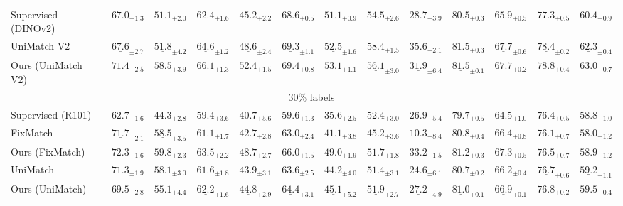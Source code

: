 \documentclass{article}\usepackage[a4paper,landscape,margin=1cm]{geometry}
\begin{document}
\begin{table}[!t]
\begin{tabularx}{\textwidth}{@{}l*{12}{>{\centering\arraybackslash}X}@{}}
\arrayrulecolor[gray]{0.65}\cmidrule[0.3pt]{1-13}\arrayrulecolor{black}
Supervised (DINOv2) & $67.0_{\pm1.3}$ & $51.1_{\pm2.0}$ & $62.4_{\pm1.6}$ & $45.2_{\pm2.2}$ & $68.6_{\pm0.5}$ & $51.1_{\pm0.9}$ & $54.5_{\pm2.6}$ & $28.7_{\pm3.9}$ & $80.5_{\pm0.3}$ & $65.9_{\pm0.5}$ & $77.3_{\pm0.5}$ & $60.4_{\pm0.9}$ \\
UniMatch V2 & $\underline{67.6}_{\pm2.7}$ & $\underline{51.8}_{\pm4.2}$ & $\underline{64.6}_{\pm1.2}$ & $\underline{48.6}_{\pm2.4}$ & $\underline{69.3}_{\pm1.1}$ & $\underline{52.5}_{\pm1.6}$ & $\mathbf{58.4}_{\pm1.5}$ & $\mathbf{35.6}_{\pm2.1}$ & $\mathbf{81.5}_{\pm0.3}$ & $\underline{67.7}_{\pm0.6}$ & $\underline{78.4}_{\pm0.2}$ & $\underline{62.3}_{\pm0.4}$ \\
Ours (UniMatch V2) & $\mathbf{71.4}_{\pm2.5}$ & $\mathbf{58.5}_{\pm3.9}$ & $\mathbf{66.1}_{\pm1.3}$ & $\mathbf{52.4}_{\pm1.5}$ & $\mathbf{69.4}_{\pm0.8}$ & $\mathbf{53.1}_{\pm1.1}$ & $\underline{56.1}_{\pm3.0}$ & $\underline{31.9}_{\pm6.4}$ & $\underline{81.5}_{\pm0.1}$ & $\mathbf{67.7}_{\pm0.2}$ & $\mathbf{78.8}_{\pm0.4}$ & $\mathbf{63.0}_{\pm0.7}$ \\
\midrule
\multicolumn{13}{c}{30\% labels} \\
\cmidrule{1-13}
Supervised (R101) & $62.7_{\pm1.6}$ & $44.3_{\pm2.8}$ & $59.4_{\pm3.6}$ & $40.7_{\pm5.6}$ & $59.6_{\pm1.3}$ & $35.6_{\pm2.5}$ & $\mathbf{52.4}_{\pm3.0}$ & $26.9_{\pm5.4}$ & $79.7_{\pm0.5}$ & $64.5_{\pm1.0}$ & $76.4_{\pm0.5}$ & $58.8_{\pm1.0}$ \\
FixMatch & $\underline{71.7}_{\pm2.1}$ & $\underline{58.5}_{\pm3.5}$ & $61.1_{\pm1.7}$ & $42.7_{\pm2.8}$ & $63.0_{\pm2.4}$ & $41.1_{\pm3.8}$ & $45.2_{\pm3.6}$ & $10.3_{\pm8.4}$ & $80.8_{\pm0.4}$ & $66.4_{\pm0.8}$ & $76.1_{\pm0.7}$ & $58.0_{\pm1.2}$ \\
Ours (FixMatch) & $\mathbf{72.3}_{\pm1.6}$ & $\mathbf{59.8}_{\pm2.3}$ & $\mathbf{63.5}_{\pm2.2}$ & $\mathbf{48.7}_{\pm2.7}$ & $\mathbf{66.0}_{\pm1.5}$ & $\mathbf{49.0}_{\pm1.9}$ & $51.7_{\pm1.8}$ & $\mathbf{33.2}_{\pm1.5}$ & $\mathbf{81.2}_{\pm0.3}$ & $\mathbf{67.3}_{\pm0.5}$ & $76.5_{\pm0.7}$ & $58.9_{\pm1.2}$ \\
UniMatch & $71.3_{\pm1.9}$ & $58.1_{\pm3.0}$ & $61.6_{\pm1.8}$ & $43.9_{\pm3.1}$ & $63.6_{\pm2.5}$ & $44.2_{\pm4.0}$ & $51.4_{\pm3.1}$ & $24.6_{\pm6.1}$ & $80.7_{\pm0.2}$ & $66.2_{\pm0.4}$ & $\underline{76.7}_{\pm0.6}$ & $\underline{59.2}_{\pm1.1}$ \\
Ours (UniMatch) & $69.5_{\pm2.8}$ & $55.1_{\pm4.4}$ & $\underline{62.2}_{\pm1.6}$ & $\underline{44.8}_{\pm2.9}$ & $\underline{64.4}_{\pm3.1}$ & $\underline{45.1}_{\pm5.2}$ & $\underline{51.9}_{\pm2.7}$ & $\underline{27.2}_{\pm4.9}$ & $\underline{81.0}_{\pm0.1}$ & $\underline{66.9}_{\pm0.1}$ & $\mathbf{76.8}_{\pm0.2}$ & $\mathbf{59.5}_{\pm0.4}$ \\

\end{tabularx}
\end{table}
\end{document}

